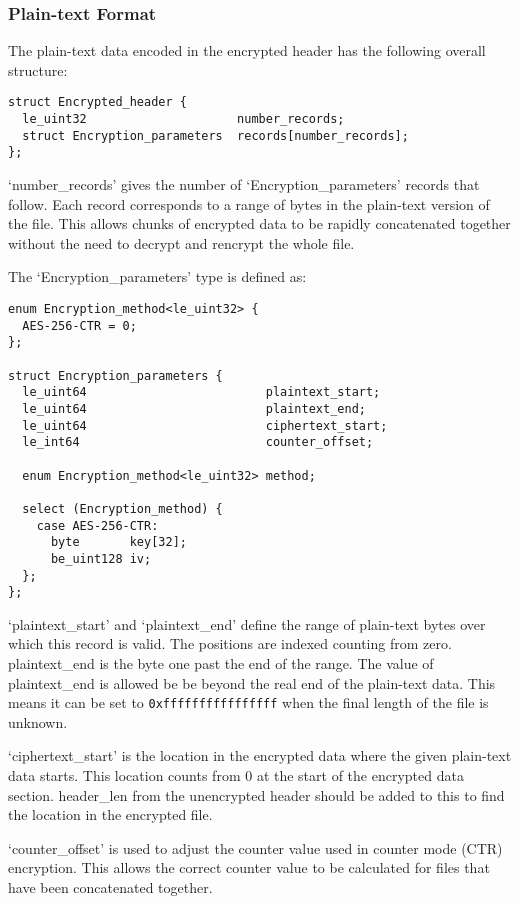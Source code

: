 \documentclass[10pt]{article}
\begin{document}
\subsubsection{Plain-text Format}
The plain-text data encoded in the encrypted header has the following overall structure:
\begin{verbatim}
struct Encrypted_header {
  le_uint32                     number_records;
  struct Encryption_parameters  records[number_records];
};
\end{verbatim}

`number\_records' gives the number of `Encryption\_parameters' records that follow.
Each record corresponds to a range of bytes in the plain-text version of the file.
This allows chunks of encrypted data to be rapidly concatenated together without the need to decrypt and rencrypt the
whole file.

The `Encryption\_parameters' type is defined as:

\begin{verbatim}
enum Encryption_method<le_uint32> {
  AES-256-CTR = 0;
};

struct Encryption_parameters {
  le_uint64                         plaintext_start;
  le_uint64                         plaintext_end;
  le_uint64                         ciphertext_start;
  le_int64                          counter_offset;

  enum Encryption_method<le_uint32> method;

  select (Encryption_method) {
    case AES-256-CTR:
      byte       key[32];
      be_uint128 iv;
  };
};
\end{verbatim}

`plaintext\_start' and `plaintext\_end' define the range of plain-text bytes over which this record is valid.
The positions are indexed counting from zero.
plaintext\_end is the byte one past the end of the range.
The value of plaintext\_end is allowed be be beyond the real end of the plain-text data.
This means it can be set to \verb+0xffffffffffffffff+ when the final length of the file is unknown.

`ciphertext\_start' is the location in the encrypted data where the given plain-text data starts.
This location counts from 0 at the start of the encrypted data section.
header\_len from the unencrypted header should be added to this to find the location in the encrypted file.

`counter\_offset' is used to adjust the counter value used in counter mode (CTR) encryption.
This allows the correct counter value to be calculated for files that have been concatenated together.
\end{document}
